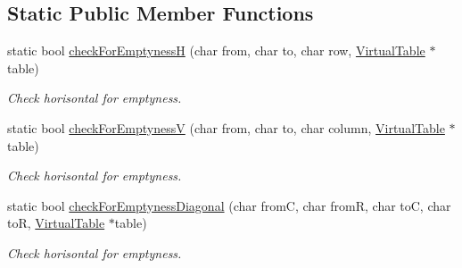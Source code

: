 \subsection*{Static Public Member Functions}
\begin{DoxyCompactItemize}
\item 
static bool \hyperlink{classChEngn_1_1Engine_aebba3d5fac90f1e829fc122b31f26064}{checkForEmptynessH} (char from, char to, char row, \hyperlink{classChEngn_1_1Table}{VirtualTable} $\ast$table)
\begin{DoxyCompactList}\small\item\em Check horisontal for emptyness. \item\end{DoxyCompactList}\item 
static bool \hyperlink{classChEngn_1_1Engine_ab812e459beb68c21e02370d0f7767299}{checkForEmptynessV} (char from, char to, char column, \hyperlink{classChEngn_1_1Table}{VirtualTable} $\ast$table)
\begin{DoxyCompactList}\small\item\em Check horisontal for emptyness. \item\end{DoxyCompactList}\item 
static bool \hyperlink{classChEngn_1_1Engine_afa008c74a0a46fc1dacd41ad2d8210e2}{checkForEmptynessDiagonal} (char fromC, char fromR, char toC, char toR, \hyperlink{classChEngn_1_1Table}{VirtualTable} $\ast$table)
\begin{DoxyCompactList}\small\item\em Check horisontal for emptyness. \item\end{DoxyCompactList}\end{DoxyCompactItemize}
